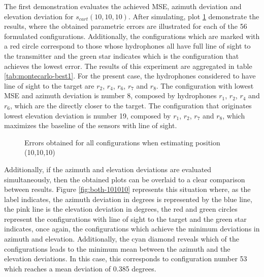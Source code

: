 The first demonstration evaluates the achieved MSE, azimuth deviation and elevation deviation for $s_{cart}(10,10,10)$. After simulating, plot \ref{fig:errors-101010} demonstrate the results, where the obtained parametric errors are illustrated for each of the 56 formulated configurations. Additionally, the configurations which are marked with a red circle correspond to those whose hydrophones all have full line of sight to the transmitter and the green star indicates which is the configuration that achieves the lowest error. The results of this experiment are aggregated in table \ref{tab:montecarlo-best1}. For the present case, the hydrophones considered to have line of sight to the target are $r_2$, $r_4$, $r_6$, $r_7$ and $r_8$. The configuration with lowest MSE and azimuth deviation is number 8, composed by hydrophones $r_1$, $r_2$, $r_4$ and $r_6$, which are the directly closer to the target. The configuration that originates lowest elevation deviation is number 19, composed by $r_1$, $r_2$, $r_7$ and $r_8$, which maximizes the baseline of the sensors with line of sight.

\begin{figure}[!htbp]
	\captionsetup{justification=centering,margin=2cm}
	\caption{Errors obtained for all configurations when estimating position (10,10,10)}
	\label{fig:errors-101010}
\end{figure}

Additionally, if the azimuth and elevation deviations are evaluated simultaneously, then the obtained plots can be overlaid to a clear comparison between results. Figure \ref{fig:both-101010} represents this situation where, as the label indicates, the azimuth deviation in degrees is represented by the blue line, the pink line is the elevation deviation in degrees, the red and green circles represent the configurations with line of sight to the target and the green star indicates, once again, the configurations which achieve the minimum deviations in azimuth and elevation. Additionally, the cyan diamond reveals which of the configurations leads to the minimum mean between the azimuth and the elevation deviations. In this case, this corresponds to configuration number 53 which reaches a mean deviation of 0.385 degrees. 

